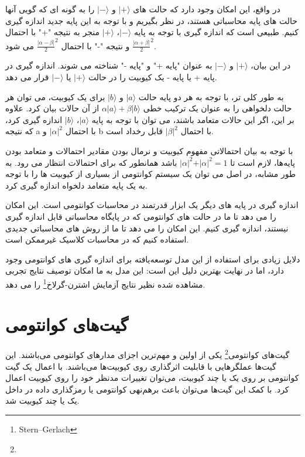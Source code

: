 \documentclass{book}
\begin{document}
در واقع، این امکان وجود دارد که حالت های $\vert+\rangle$ و $\vert-\rangle$ را به گونه ای که گویی آنها حالت های پایه محاسباتی هستند، در نظر بگیریم و با توجه به این پایه جدید اندازه گیری کنیم. طبیعی است که اندازه گیری با توجه به پایه $\vert-\rangle$، $\vert+\rangle$ منجر به نتیجه "+" با احتمال $\frac{\vert\alpha + \beta\vert}{2}^2$ و نتیجه "-" با احتمال $\frac{\vert\alpha - \beta\vert}{2}^2$ می شود.


در این بیان، $\vert+\rangle$ و $\vert-\rangle$ به عنوان "پایه +" و "پایه -" شناخته می شوند. اندازه گیری در پایه + یا پایه - یک کیوبیت را در حالت $\vert+\rangle$ یا $\vert-\rangle$ قرار می دهد.

به طور کلی تر، با توجه به هر دو پایه حالت $\vert a\rangle$ و $\vert b\rangle$ برای یک کیوبیت، می توان هر حالت دلخواهی را به عنوان یک ترکیب خطی $\alpha \vert a\rangle + \beta \vert b\rangle$ از آن حالات بیان کرد. علاوه بر این، اگر این حالات  متعامد باشند، می توان با توجه به پایه $\vert a\rangle$، $\vert b\rangle$ اندازه گیری کرد، که نتیجه a با احتمال $\vert\alpha\vert ^2$ و b با احتمال $\vert\beta\vert ^2$ قابل رخداد است.

با توجه به بیان احتمالاتی مفهوم کیوبیت و نرمال بودن مقادیر احتمالات و متعامد بودن پایه‌ها، لازم است تا $\vert\alpha\vert ^ 2 + \vert\alpha\vert ^ 2 = 1$ باشد همانطور که برای احتمالات انتظار می رود. به طور مشابه، در اصل می توان یک سیستم کوانتومی از بسیاری از کیوبیت ها را با توجه به یک پایه متعامد دلخواه اندازه گیری کرد.

اندازه گیری در پایه های دیگر یک ابزار قدرتمند در محاسبات کوانتومی است. این امکان را می دهد تا ما در حالت های کوانتومی که در پایگاه محاسباتی قابل اندازه گیری نیستند، اندازه گیری کنیم. این امکان را می دهد تا ما از روش های محاسباتی جدیدی استفاده کنیم که در محاسبات کلاسیک غیرممکن است.

دلایل زیادی برای استفاده از این مدل توسعه‌یافته برای اندازه گیری های کوانتومی وجود دارد، اما در نهایت بهترین دلیل این است: این مدل به ما امکان توصیف نتایج تجربی مشاهده شده نظیر نتایج آزمایش اشترن-گرلاخ\footnote{Stern–Gerlach} را می دهد.
\section{گیت‌های کوانتومی}
گیت‌های کوانتومی\footnote{} یکی از اولین و مهم‌ترین اجزای‌ مدار‌های کوانتومی ‌می‌باشند. این گیت‌ها عملگر‌هایی با قابلیت اثر‌گذاری روی کیوبیت‌ها می‌باشند. با اعمال یک گیت کوانتومی بر روی یک یا چند کیوبیت، می‌توان تغییرات مدنظر خود را روی کیوبیت اعمال کرد. با کمک این گیت‌ها می‌توان باعث برهم‌نهی کوانتومی یا رمز‌گذاری داده در داخل یک یا چند کیوبیت شد.
\end{document}
